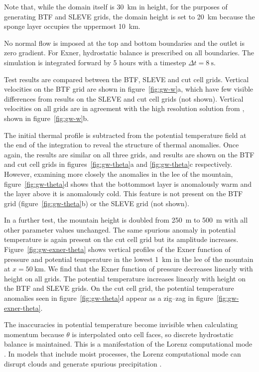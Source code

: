 \documentclass[twocol]{ametsoc}
\begin{document}
Note that, while the domain itself is \SI{30}{\kilo\meter} in height, for the purposes of generating BTF and SLEVE grids, the domain height is set to \SI{20}{\kilo\meter} because the sponge layer occupies the uppermost \SI{10}{\kilo\meter}.

No normal flow is imposed at the top and bottom boundaries and the outlet is zero gradient.  For Exner, hydrostatic balance is prescribed on all boundaries.  The simulation is integrated forward by 5 hours with a timestep $\Delta t = \SI{8}{\second}$.

Test results are compared between the BTF, SLEVE and cut cell grids.  Vertical velocities on the BTF grid are shown in figure~\ref{fig:gw-w}a, which have few visible differences from results on the SLEVE and cut cell grids (not shown).  Vertical velocities on all grids are in agreement with the high resolution solution from \citet{melvin2010}, shown in figure~\ref{fig:gw-w}b.

The initial thermal profile is subtracted from the potential temperature field at the end of the integration to reveal the structure of thermal anomalies.  Once again, the results are similar on all three grids, and results are shown on the BTF and cut cell grids in figures~\ref{fig:gw-theta}a and \ref{fig:gw-theta}c respectively.  However, examining more closely the anomalies in the lee of the mountain, figure~\ref{fig:gw-theta}d shows that the bottommost layer is anomalously warm and the layer above it is anomalously cold.  This feature is not present on the BTF grid (figure~\ref{fig:gw-theta}b) or the SLEVE grid (not shown).  

In a further test, the mountain height is doubled from \SI{250}{\meter} to \SI{500}{\meter} with all other parameter values unchanged.  The same spurious anomaly in potential temperature is again present on the cut cell grid but its amplitude increases.  Figure~\ref{fig:gw-exner-theta} shows vertical profiles of the Exner function of pressure and potential temperature in the lowest \SI{1}{\kilo\meter} in the lee of the mountain at \(x = \SI{50}{\kilo\meter}\).  We find that the Exner function of pressure decreases linearly with height on all grids.  The potential temperature increases linearly with height on the BTF and SLEVE grids.  On the cut cell grid, the potential temperature anomalies seen in figure~\ref{fig:gw-theta}d appear as a zig--zag in figure~\ref{fig:gw-exner-theta}.

The inaccuracies in potential temperature become invisible when calculating momentum because $\theta$ is interpolated onto cell faces, so discrete hydrostatic balance is maintained.  This is a manifestation of the Lorenz computational mode \citep{arakawa-konor1996,holdaway2013b}.  In models that include moist processes, the Lorenz computational mode can disrupt clouds and generate spurious precipitation \citep{hollingsworth1995}.
\end{document}
